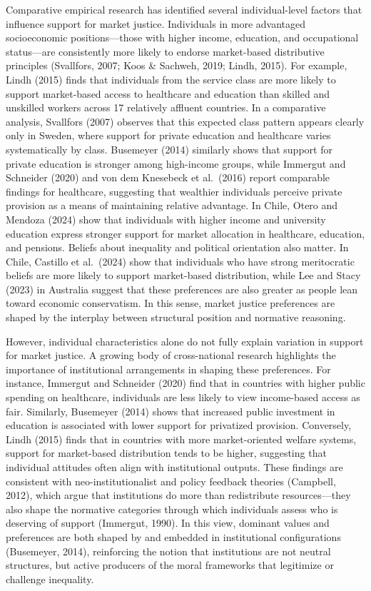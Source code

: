 \documentclass[
  12pt,
]{article}
\begin{document}
Comparative empirical research has identified several individual-level
factors that influence support for market justice. Individuals in more
advantaged socioeconomic positions---those with higher income,
education, and occupational status---are consistently more likely to
endorse market-based distributive principles (Svallfors, 2007; Koos \&
Sachweh, 2019; Lindh, 2015). For example, Lindh (2015) finds that
individuals from the service class are more likely to support
market-based access to healthcare and education than skilled and
unskilled workers across 17 relatively affluent countries. In a
comparative analysis, Svallfors (2007) observes that this expected class
pattern appears clearly only in Sweden, where support for private
education and healthcare varies systematically by class. Busemeyer
(2014) similarly shows that support for private education is stronger
among high-income groups, while Immergut and Schneider (2020) and von
dem Knesebeck et al.~(2016) report comparable findings for healthcare,
suggesting that wealthier individuals perceive private provision as a
means of maintaining relative advantage. In Chile, Otero and Mendoza
(2024) show that individuals with higher income and university education
express stronger support for market allocation in healthcare, education,
and pensions. Beliefs about inequality and political orientation also
matter. In Chile, Castillo et al.~(2024) show that individuals who have
strong meritocratic beliefs are more likely to support market-based
distribution, while Lee and Stacy (2023) in Australia suggest that these
preferences are also greater as people lean toward economic
conservatism. In this sense, market justice preferences are shaped by
the interplay between structural position and normative reasoning.

However, individual characteristics alone do not fully explain variation
in support for market justice. A growing body of cross-national research
highlights the importance of institutional arrangements in shaping these
preferences. For instance, Immergut and Schneider (2020) find that in
countries with higher public spending on healthcare, individuals are
less likely to view income-based access as fair. Similarly, Busemeyer
(2014) shows that increased public investment in education is associated
with lower support for privatized provision. Conversely, Lindh (2015)
finds that in countries with more market-oriented welfare systems,
support for market-based distribution tends to be higher, suggesting
that individual attitudes often align with institutional outputs. These
findings are consistent with neo-institutionalist and policy feedback
theories (Campbell, 2012), which argue that institutions do more than
redistribute resources---they also shape the normative categories
through which individuals assess who is deserving of support (Immergut,
1990). In this view, dominant values and preferences are both shaped by
and embedded in institutional configurations (Busemeyer, 2014),
reinforcing the notion that institutions are not neutral structures, but
active producers of the moral frameworks that legitimize or challenge
inequality.
\end{document}
